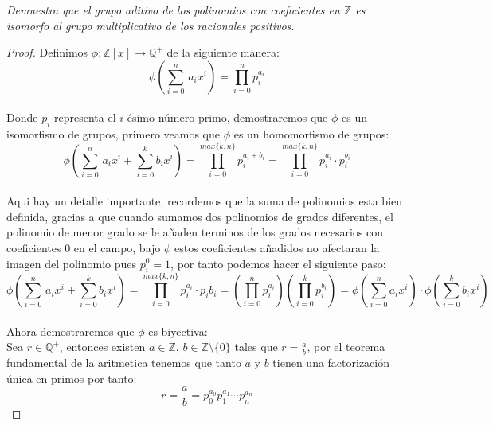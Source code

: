 \documentclass[11pt,letterpaper]{article}
\newcommand{\Z}{\mathbb{Z}}
\newcommand{\Q}{\mathbb{Q}}
\begin{document}
\begin{tcolorbox}[
	title = \textcolor{black}{\textcolor{white}{Problema 9}},]
\textit{Demuestra que el grupo aditivo de los polinomios con coeficientes en $\Z$ es isomorfo al grupo multiplicativo de los racionales positivos.
}
\end{tcolorbox}
\begin{proof}
    Definimos $\phi:\Z[x]\to \Q^{+}$ de la siguiente manera:\,\\
    \begin{equation*}
        \phi\left(\sum_{i=0}^n\,a_ix^i\right)=\prod_{i=0}^{n}p_i^{a_i}
    \end{equation*}\,\\
    Donde $p_i$ representa el $i$-\'esimo n\'umero primo, demostraremos que $\phi$ es un isomorfismo de grupos, primero veamos que $\phi$ es un homomorfismo de grupos:\,\\
    \begin{equation*}
        \phi\left(\sum_{i=0}^n\,a_ix^i+\sum_{i=0}^kb_ix^i\right)=\prod_{i=0}^{max\{k,n\}}p_i^{a_i+b_i}=\prod_{i=0}^{max\{k,n\}}p_i^{a_i}\cdot p_i^{b_i}
    \end{equation*}\,\\
    Aqui hay un detalle importante, recordemos que la suma de polinomios esta bien definida, gracias a que cuando sumamos dos polinomios de grados diferentes, el polinomio de menor grado se le añaden terminos de los grados necesarios con coeficientes $0$ en el campo, bajo $\phi$ estos coeficientes añadidos
    no afectaran la imagen del polinomio pues $p_i^0=1$, por tanto podemos hacer el siguiente paso:\,\\
    \begin{equation*}
             \phi\left(\sum_{i=0}^n\,a_ix^i+\sum_{i=0}^kb_ix^i\right)=\prod_{i=0}^{max\{k,n\}}p_i^{a_i}\cdot p_i{b_i}=\left(\prod_{i=0}^np_i^{a_i}\right)\left(\prod_{i=0}^kp_i^{b_i}\right)=\phi\left(\sum_{i=0}^na_ix^i\right)\cdot\phi\left(\sum_{i=0}^k b_ix^i\right)
    \end{equation*}\,\\
    Ahora demostraremos que $\phi$ es biyectiva:\,\\
    Sea $r\in \Q^{+}$, entonces existen $a\in \Z$, $b\in \Z\setminus\{0\}$ tales que $r=\frac{a}{b}$, por el teorema fundamental de la aritmetica tenemos que tanto $a$ y $b$ tienen una factorizaci\'on \'unica en primos por tanto:\,\\
    \begin{equation*}
        r=\frac{a}{b}=p_0^{a_0}p_1^{a_1}\cdots p_n^{a_n}

\end{equation*}
\end{proof}
\end{document}
